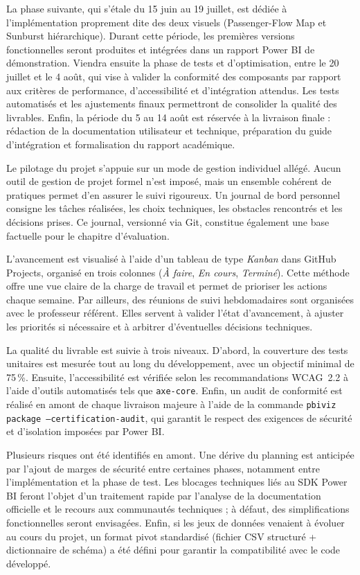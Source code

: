 La phase suivante, qui s’étale du 15 juin au 19 juillet, est dédiée à l’implémentation proprement dite des deux visuels (Passenger-Flow Map et Sunburst hiérarchique). Durant cette période, les premières versions fonctionnelles seront produites et intégrées dans un rapport Power BI de démonstration. Viendra ensuite la phase de tests et d’optimisation, entre le 20 juillet et le 4 août, qui vise à valider la conformité des composants par rapport aux critères de performance, d’accessibilité et d’intégration attendus. Les tests automatisés et les ajustements finaux permettront de consolider la qualité des livrables. Enfin, la période du 5 au 14 août est réservée à la livraison finale : rédaction de la documentation utilisateur et technique, préparation du guide d’intégration et formalisation du rapport académique.

Le pilotage du projet s’appuie sur un mode de gestion individuel allégé. Aucun outil de gestion de projet formel n’est imposé, mais un ensemble cohérent de pratiques permet d’en assurer le suivi rigoureux. Un journal de bord personnel consigne les tâches réalisées, les choix techniques, les obstacles rencontrés et les décisions prises. Ce journal, versionné via Git, constitue également une base factuelle pour le chapitre d’évaluation.

L’avancement est visualisé à l’aide d’un tableau de type \emph{Kanban} dans GitHub Projects, organisé en trois colonnes (\emph{À faire}, \emph{En cours}, \emph{Terminé}). Cette méthode offre une vue claire de la charge de travail et permet de prioriser les actions chaque semaine. Par ailleurs, des réunions de suivi hebdomadaires sont organisées avec le professeur référent. Elles servent à valider l’état d’avancement, à ajuster les priorités si nécessaire et à arbitrer d’éventuelles décisions techniques.

La qualité du livrable est suivie à trois niveaux. D’abord, la couverture des tests unitaires est mesurée tout au long du développement, avec un objectif minimal de 75\,\%. Ensuite, l’accessibilité est vérifiée selon les recommandations WCAG~2.2 à l’aide d’outils automatisés tels que \texttt{axe-core}. Enfin, un audit de conformité est réalisé en amont de chaque livraison majeure à l’aide de la commande \texttt{pbiviz package --certification-audit}, qui garantit le respect des exigences de sécurité et d’isolation imposées par Power BI.

Plusieurs risques ont été identifiés en amont. Une dérive du planning est anticipée par l’ajout de marges de sécurité entre certaines phases, notamment entre l’implémentation et la phase de test. Les blocages techniques liés au SDK Power BI feront l’objet d’un traitement rapide par l’analyse de la documentation officielle et le recours aux communautés techniques ; à défaut, des simplifications fonctionnelles seront envisagées. Enfin, si les jeux de données venaient à évoluer au cours du projet, un format pivot standardisé (fichier CSV structuré + dictionnaire de schéma) a été défini pour garantir la compatibilité avec le code développé.

